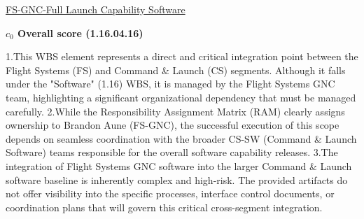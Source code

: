 % 


\begin{frame}{\href{run:../local/source-docs/1.16.04.16.pdf}{FS-GNC-Full Launch Capability Software}}
\centering
{}
\par
\vspace{0.75em}
\textbf{\small{\(c_0\) Overall score {\tiny (1.16.04.16)}}}\\\par
\vspace{0.5em}
\begin{minipage}{0.85\textwidth}
\raggedright
\fontsize{7}{9}\selectfont
1.This WBS element represents a direct and critical integration point between the Flight Systems (FS) and Command \& Launch (CS) segments. Although it falls under the "Software" (1.16) WBS, it is managed by the Flight Systems GNC team, highlighting a significant organizational dependency that must be managed carefully. 2.While the Responsibility Assignment Matrix (RAM) clearly assigns ownership to Brandon Aune (FS-GNC), the successful execution of this scope depends on seamless coordination with the broader CS-SW (Command \& Launch Software) teams responsible for the overall software capability releases. 3.The integration of Flight Systems GNC software into the larger Command \& Launch software baseline is inherently complex and high-risk. The provided artifacts do not offer visibility into the specific processes, interface control documents, or coordination plans that will govern this critical cross-segment integration.\par
\end{minipage}
\end{frame}
%

